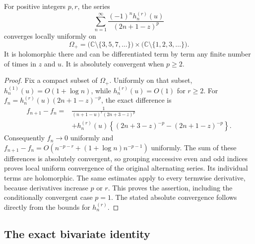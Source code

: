 \begin{lemma}\label{mld:gh:lem:convergence}
For positive integers $p,r$, the series
\[
 \sum_{n=1}^{\infty}
 \frac{(-1)^n h_n^{(r)}(u)}{(2n+1-z)^p}
\]
converges locally uniformly on
\[
 \Omega_+=
 \bigl(\mathbb C\setminus\{3,5,7,\ldots\}\bigr)
 \times\bigl(\mathbb C\setminus\{1,2,3,\ldots\}\bigr).
\]
It is holomorphic there and can be differentiated term by term any
finite number of times in $z$ and $u$. It is absolutely convergent
when $p\geq2$.
\end{lemma}
\begin{proof}
Fix a compact subset of $\Omega_+$. Uniformly on that subset,
$h_n^{(1)}(u)=O(1+\log n)$, while $h_n^{(r)}(u)=O(1)$ for $r\geq2$.
For
$f_n=h_n^{(r)}(u)(2n+1-z)^{-p}$, the exact difference is
\begin{align*}
 f_{n+1}-f_n
 ={}&\frac{1}{(n+1-u)^r(2n+3-z)^p}\\
 &+h_n^{(r)}(u)
       \left\{(2n+3-z)^{-p}-(2n+1-z)^{-p}\right\}.
\end{align*}
Consequently $f_n\to0$ uniformly and
$f_{n+1}-f_n=O(n^{-p-r}+(1+\log n)n^{-p-1})$ uniformly.
The sum of these differences is absolutely convergent, so grouping
successive even and odd indices proves local uniform convergence of
the original alternating series. Its individual terms are holomorphic.
The same estimates apply to every termwise derivative, because
derivatives increase $p$ or $r$. This proves the assertion, including
the conditionally convergent case $p=1$. The stated absolute convergence
follows directly from the bounds for $h_n^{(r)}$.
\end{proof}

\subsection{The exact bivariate identity}

